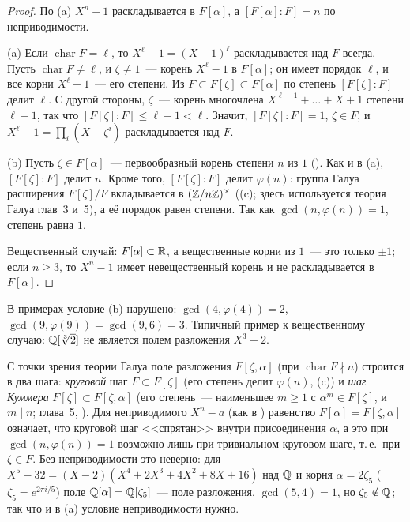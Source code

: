 \begin{proof}
По (a) $X^n-1$ раскладывается в $F[\alpha]$, а $[F[\alpha]:F]=n$ по неприводимости.

(a) Если $\operatorname{char}F=\ell$, то $X^\ell-1=(X-1)^\ell$ раскладывается над $F$ всегда. Пусть
$\operatorname{char}F\ne\ell$, и $\zeta\ne1$~--- корень $X^\ell-1$ в $F[\alpha]$; он имеет порядок $\ell$, и все корни
$X^\ell-1$~--- его степени. Из $F\subset F[\zeta]\subset F[\alpha]$ по  степень $[F[\zeta]:F]$ делит $\ell$. С другой
стороны, $\zeta$~--- корень многочлена $X^{\ell-1}+\dots+X+1$ степени $\ell-1$, так что $[F[\zeta]:F]\le\ell-1<\ell$.
Значит, $[F[\zeta]:F]=1$, $\zeta\in F$, и $X^\ell-1=\prod_{i}(X-\zeta^i)$ раскладывается над $F$.

(b) Пусть $\zeta\in F[\alpha]$~--- первообразный корень степени $n$ из $1$ (). Как и в (a), $[F[\zeta]:F]$ делит $n$.
Кроме того, $[F[\zeta]:F]$ делит $\varphi(n)$: группа Галуа расширения $F[\zeta]/F$ вкладывается в $(\mathbb Z/n\mathbb Z)^\times$ ((c); здесь используется теория Галуа
глав~3 и~5),
а её порядок равен степени. Так как $\gcd(n,\varphi(n))=1$, степень равна $1$.

Вещественный случай: $F[\alpha]\subset\mathbb R$, а вещественные корни из $1$~--- это только $\pm1$; если $n\ge3$, то $X^n-1$ имеет
невещественный корень и не раскладывается в $F[\alpha]$.
\end{proof}

В примерах  условие (b) нарушено: $\gcd(4,\varphi(4))=2$, $\gcd(9,\varphi(9))=\gcd(9,6)=3$. Типичный
пример к вещественному случаю: $\mathbb Q[\sqrt[3]2]$ не является полем разложения $X^3-2$.

С точки зрения теории Галуа поле разложения $F[\zeta,\alpha]$ (при $\operatorname{char}F\nmid n$) строится в два шага:
\emph{круговой} шаг $F\subset F[\zeta]$ (его степень делит $\varphi(n)$, (c)) и \emph{шаг Куммера}
$F[\zeta]\subset F[\zeta,\alpha]$ (его степень~--- наименьшее $m\ge1$ с $\alpha^m\in F[\zeta]$, и $m\mid n$; глава~5, ).
Для неприводимого $X^n-a$ (как в ) равенство $F[\alpha]=F[\zeta,\alpha]$ означает, что круговой шаг <<спрятан>>
внутри присоединения $\alpha$, а это при $\gcd(n,\varphi(n))=1$ возможно лишь при тривиальном круговом шаге, т.\,е.\ при
$\zeta\in F$. Без неприводимости это неверно: для $X^5-32=(X-2)(X^4+2X^3+4X^2+8X+16)$ над $\mathbb Q$ и корня $\alpha=2\zeta_5$
($\zeta_5=e^{2\pi i/5}$) поле $\mathbb Q[\alpha]=\mathbb Q[\zeta_5]$~--- поле разложения, $\gcd(5,4)=1$, но $\zeta_5\notin\mathbb Q$; так что и в
(a) условие неприводимости нужно.

